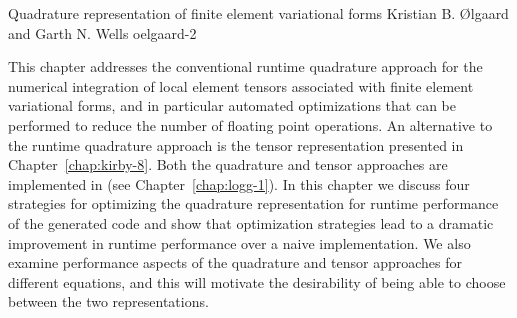              {Quadrature representation of finite element variational forms}
              {Kristian B. \O{}lgaard and Garth N. Wells}
              {oelgaard-2}

This chapter addresses the conventional runtime quadrature approach
for the numerical integration of local element tensors associated
with finite element variational forms, and in particular automated
optimizations that can be performed to reduce the number of floating
point operations.  An alternative to the runtime quadrature approach
is the tensor representation presented in Chapter~\ref{chap:kirby-8}.
Both the quadrature and tensor approaches are implemented in \ffc{}
(see Chapter~\ref{chap:logg-1}).  In this chapter we discuss four
strategies for optimizing the quadrature representation for runtime
performance of the generated code and show that optimization strategies
lead to a dramatic improvement in runtime performance over a naive
implementation.  We also examine performance aspects of the quadrature
and tensor approaches for different equations, and this will motivate
the desirability of being able to choose between the two representations.
